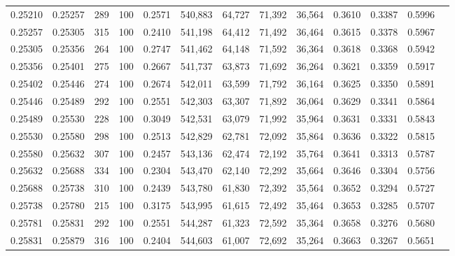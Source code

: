\begin{tabular}{rrrrrrrrrrrrr}
0.25210 & 0.25257 &   289 & 100 &                                     0.2571 & 540,883 &  64,727 &  71,392 &  36,564 & 0.3610 & 0.3387 & 0.5996 \\
0.25257 & 0.25305 &   315 & 100 &                                     0.2410 & 541,198 &  64,412 &  71,492 &  36,464 & 0.3615 & 0.3378 & 0.5967 \\
0.25305 & 0.25356 &   264 & 100 &                                     0.2747 & 541,462 &  64,148 &  71,592 &  36,364 & 0.3618 & 0.3368 & 0.5942 \\
0.25356 & 0.25401 &   275 & 100 &                                     0.2667 & 541,737 &  63,873 &  71,692 &  36,264 & 0.3621 & 0.3359 & 0.5917 \\
0.25402 & 0.25446 &   274 & 100 &                                     0.2674 & 542,011 &  63,599 &  71,792 &  36,164 & 0.3625 & 0.3350 & 0.5891 \\
0.25446 & 0.25489 &   292 & 100 &                                     0.2551 & 542,303 &  63,307 &  71,892 &  36,064 & 0.3629 & 0.3341 & 0.5864 \\
0.25489 & 0.25530 &   228 & 100 &                                     0.3049 & 542,531 &  63,079 &  71,992 &  35,964 & 0.3631 & 0.3331 & 0.5843 \\
0.25530 & 0.25580 &   298 & 100 &                                     0.2513 & 542,829 &  62,781 &  72,092 &  35,864 & 0.3636 & 0.3322 & 0.5815 \\
0.25580 & 0.25632 &   307 & 100 &                                     0.2457 & 543,136 &  62,474 &  72,192 &  35,764 & 0.3641 & 0.3313 & 0.5787 \\
0.25632 & 0.25688 &   334 & 100 &                                     0.2304 & 543,470 &  62,140 &  72,292 &  35,664 & 0.3646 & 0.3304 & 0.5756 \\
0.25688 & 0.25738 &   310 & 100 &                                     0.2439 & 543,780 &  61,830 &  72,392 &  35,564 & 0.3652 & 0.3294 & 0.5727 \\
0.25738 & 0.25780 &   215 & 100 &                                     0.3175 & 543,995 &  61,615 &  72,492 &  35,464 & 0.3653 & 0.3285 & 0.5707 \\
0.25781 & 0.25831 &   292 & 100 &                                     0.2551 & 544,287 &  61,323 &  72,592 &  35,364 & 0.3658 & 0.3276 & 0.5680 \\
0.25831 & 0.25879 &   316 & 100 &                                     0.2404 & 544,603 &  61,007 &  72,692 &  35,264 & 0.3663 & 0.3267 & 0.5651 \\

\end{tabular}
